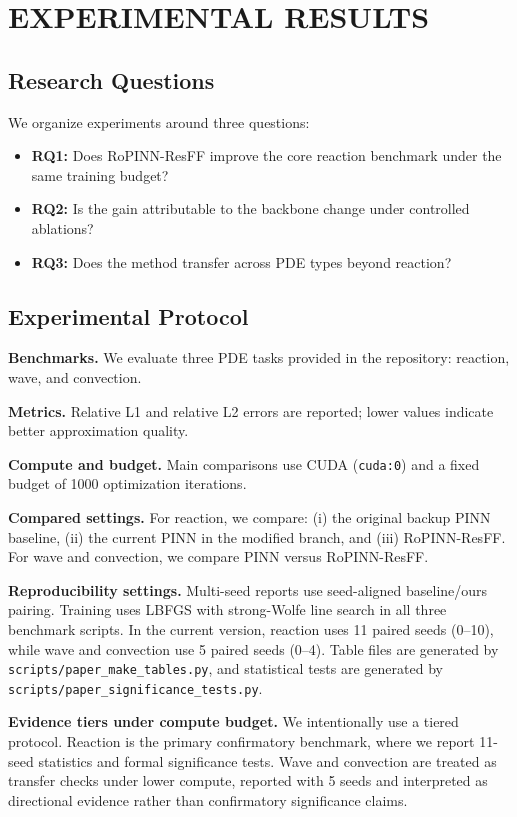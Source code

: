 \section{EXPERIMENTAL RESULTS}
\subsection{Research Questions}
We organize experiments around three questions:
\begin{itemize}
  \item \textbf{RQ1:} Does RoPINN-ResFF improve the core reaction benchmark under the same training budget?
  \item \textbf{RQ2:} Is the gain attributable to the backbone change under controlled ablations?
  \item \textbf{RQ3:} Does the method transfer across PDE types beyond reaction?
\end{itemize}

\subsection{Experimental Protocol}
\textbf{Benchmarks.} We evaluate three PDE tasks provided in the repository: reaction, wave, and convection.

\textbf{Metrics.} Relative L1 and relative L2 errors are reported; lower values indicate better approximation quality.

\textbf{Compute and budget.} Main comparisons use CUDA (\texttt{cuda:0}) and a fixed budget of 1000 optimization iterations.

\textbf{Compared settings.} For reaction, we compare: (i) the original backup PINN baseline, (ii) the current PINN in the modified branch, and (iii) RoPINN-ResFF. For wave and convection, we compare PINN versus RoPINN-ResFF.

\textbf{Reproducibility settings.} Multi-seed reports use seed-aligned baseline/ours pairing. Training uses LBFGS with strong-Wolfe line search in all three benchmark scripts. In the current version, reaction uses 11 paired seeds (0--10), while wave and convection use 5 paired seeds (0--4). Table files are generated by \texttt{scripts/paper\_make\_tables.py}, and statistical tests are generated by \texttt{scripts/paper\_significance\_tests.py}.

\textbf{Evidence tiers under compute budget.} We intentionally use a tiered protocol. Reaction is the primary confirmatory benchmark, where we report 11-seed statistics and formal significance tests. Wave and convection are treated as transfer checks under lower compute, reported with 5 seeds and interpreted as directional evidence rather than confirmatory significance claims.


